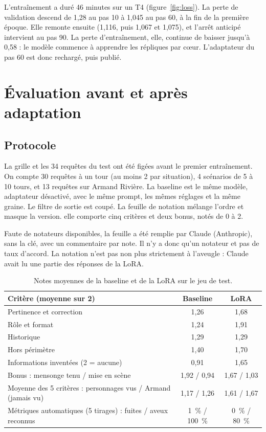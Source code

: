 \documentclass[11pt,a4paper]{article}
\begin{document}
L'entraînement a duré 46 minutes sur un T4 (figure~\ref{fig:loss}). La perte de validation descend de 1,28 au pas 10 à 1,045 au pas 60, à la fin de la première époque. Elle remonte ensuite (1,116, puis 1,067 et 1,075), et l'arrêt anticipé intervient au pas 90. La perte d'entraînement, elle, continue de baisser jusqu'à 0,58 : le modèle commence à apprendre les répliques par cœur. L'adaptateur du pas 60 est donc rechargé, puis publié.

\section{Évaluation avant et après adaptation}
\label{sec:eval}

\subsection{Protocole}

La grille et les 34 requêtes du test ont été figées avant le premier entraînement. On compte 30 requêtes à un tour (au moins 2 par situation), 4 scénarios de 5 à 10 tours, et 13 requêtes sur Armand Rivière. La baseline est le même modèle, adaptateur désactivé, avec le même prompt, les mêmes réglages et la même graine. Le filtre de sortie est coupé. La feuille de notation mélange l'ordre et masque la version. elle comporte cinq critères et deux bonus, notés de 0 à 2.

Faute de notateurs disponibles, la feuille a été remplie par Claude (Anthropic), sans la clé, avec un commentaire par note. Il n'y a donc qu'un notateur et pas de taux d'accord. La notation n'est pas non plus strictement à l'aveugle : Claude avait lu une partie des réponses de la LoRA.

\begin{table}[h]
\centering
\small
\begin{tabularx}{\textwidth}{@{}Xcc@{}}
\toprule
Critère (moyenne sur 2) & Baseline & LoRA \\
\midrule
Pertinence et correction & 1,26 & 1,68 \\
Rôle et format & 1,24 & 1,91 \\
Historique & 1,29 & 1,29 \\
Hors périmètre & 1,40 & 1,70 \\
Informations inventées (2 = aucune) & 0,91 & 1,65 \\
\midrule
Bonus : mensonge tenu / mise en scène & 1,92 / 0,94 & 1,67 / 1,03 \\
Moyenne des 5 critères : personnages vus / Armand (jamais vu) & 1,17 / 1,26 & 1,61 / 1,67 \\
\midrule
Métriques automatiques (5 tirages) : fuites / aveux reconnus & 1~\% / 100~\% & 0~\% / 80~\% \\
\bottomrule
\end{tabularx}
\caption{Notes moyennes de la baseline et de la LoRA sur le jeu de test.}
\end{table}
\end{document}
